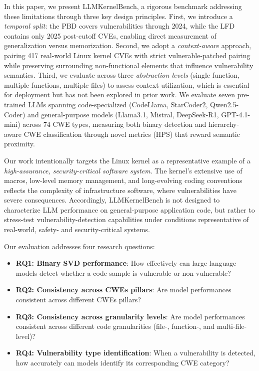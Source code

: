 \documentclass[lettersize,journal]{IEEEtran}
\begin{document}
In this paper, we present LLMKernelBench, a rigorous benchmark addressing these limitations through three key design principles. First, we introduce a \emph{temporal split}: the \gls{PBD} covers vulnerabilities through 2024, while the \gls{LFD} contains only 2025 post-cutoff CVEs, enabling direct measurement of generalization versus memorization. Second, we adopt a \emph{context-aware} approach, pairing 417 real-world Linux kernel CVEs with strict vulnerable-patched pairing while preserving surrounding non-functional elements that influence vulnerability semantics. Third, we evaluate across three \emph{abstraction levels} (single function, multiple functions, multiple files) to assess context utilization, which is essential for deployment but has not been explored in prior work. We evaluate seven pre-trained \glspl{LLM} spanning code-specialized (CodeLlama, StarCoder2, Qwen2.5-Coder) and general-purpose models (Llama3.1, Mistral, DeepSeek-R1, GPT-4.1-mini) across 74 \gls{CWE} types, measuring both binary detection and hierarchy-aware CWE classification through novel metrics (\gls{HPS}) that reward semantic proximity.

Our work intentionally targets the Linux kernel as a representative example of a \emph{high-assurance, security-critical software system}. The kernel’s extensive use of macros, low-level memory management, and long-evolving coding conventions reflects the complexity of infrastructure software, where vulnerabilities have severe consequences. Accordingly, LLMKernelBench is not designed to characterize LLM performance on general-purpose application code, but rather to stress-test vulnerability-detection capabilities under conditions representative of real-world, safety- and security-critical systems.

Our evaluation addresses four research questions: 



\begin{itemize}

\item \textbf{RQ1: Binary \gls{SVD} performance}: How effectively can large language models detect whether a code sample is vulnerable or non-vulnerable?

\item \textbf{RQ2: Consistency across \glspl{CWE} pillars}: Are model performances consistent across different \glspl{CWE} pillars?

\item \textbf{RQ3: Consistency across granularity levels}: Are model performances consistent across different code granularities (file-, function-, and multi-file-level)?

\item \textbf{RQ4: Vulnerability type identification}: When a vulnerability is detected, how accurately can models identify its corresponding \gls{CWE} category?
\end{itemize}
\end{document}
